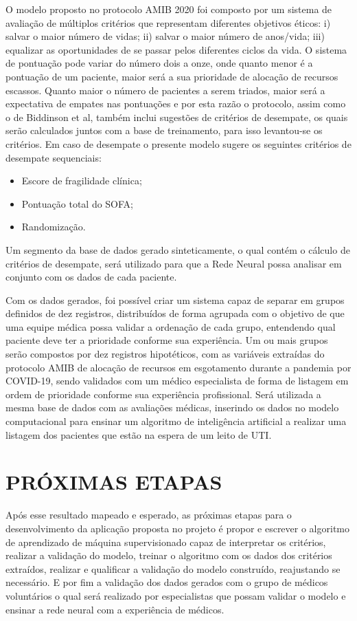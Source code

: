 \documentclass[12pt]{article}
\begin{document}
O modelo proposto no protocolo AMIB 2020 foi composto por um sistema de avaliação de múltiplos critérios que representam diferentes objetivos éticos: i) salvar o maior número de vidas; ii) salvar o maior número de anos/vida; iii) equalizar as oportunidades de se passar pelos diferentes ciclos da vida. O sistema de pontuação pode variar do número dois a onze, onde quanto menor é a pontuação de um paciente, maior será a sua prioridade de alocação de recursos escassos. Quanto maior o número de pacientes a serem triados, maior será a expectativa de empates nas pontuações e por esta razão o protocolo, assim como o de Biddinson et al, também inclui sugestões de critérios de desempate, os quais serão calculados juntos com a base de treinamento, para isso levantou-se os critérios. Em caso de desempate o presente modelo sugere os seguintes critérios de desempate sequenciais:
\begin{itemize}
  \item Escore de fragilidade clínica;
  \item Pontuação total do SOFA;
  \item Randomização.
\end{itemize}

Um segmento da base de dados gerado sinteticamente, o qual contém o cálculo de critérios de desempate, será utilizado para que a Rede Neural possa analisar em conjunto com os dados de cada paciente.


Com os dados gerados, foi possível criar um sistema capaz de separar em grupos definidos de dez registros, distribuídos de forma agrupada com o objetivo de que uma equipe médica possa validar a ordenação de cada grupo, entendendo qual paciente deve ter a prioridade conforme sua experiência. 
Um ou mais grupos serão compostos por dez registros hipotéticos, com as variáveis extraídas do protocolo AMIB de alocação de recursos em esgotamento durante a pandemia por COVID-19, sendo validados com um médico especialista de forma de listagem em ordem de prioridade conforme sua experiência profissional.
Será utilizada a mesma base de dados com as avaliações médicas, inserindo os dados no modelo computacional para ensinar um algoritmo de inteligência artificial a realizar uma listagem dos pacientes que estão na espera de um leito de UTI.

\section{PRÓXIMAS ETAPAS}
Após esse resultado mapeado e esperado, as próximas etapas para o desenvolvimento da aplicação proposta no projeto é propor e escrever o algoritmo de aprendizado de máquina supervisionado capaz de interpretar os critérios, realizar a validação do modelo, treinar o algoritmo com os dados dos critérios extraídos, realizar e qualificar a validação do modelo construído, reajustando se necessário.
E por fim a validação dos dados gerados com o grupo de médicos voluntários o qual será realizado por especialistas que possam validar o modelo e ensinar a rede neural com a experiência de médicos.
\end{document}
